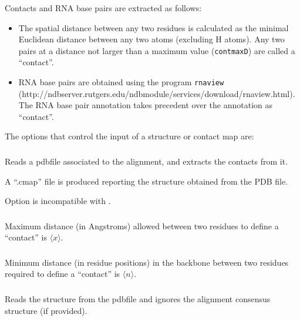 Contacts and RNA base pairs are extracted as follows:
\begin{itemize}

\item The spatial distance between any two residues is calculated as the  minimal Euclidean distance between any two atoms (excluding
 H atoms). Any two pairs at a distance not larger than a maximum value
(\texttt{contmaxD}) are called a ``contact''.

\item RNA base pairs are obtained using the program \texttt{rnaview}~\citep{YangWesthof03}\\
(http://ndbserver.rutgers.edu/ndbmodule/services/download/rnaview.html).\\
The RNA base pair annotation takes precedent over the annotation as ``contact''.
\end{itemize}

\vspace{2mm}
\noindent
The options that control the input of a structure or contact map are:

\subsubsection{} Reads a pdbfile associated to the alignment, and extracts the contacts
from it.

A ``.cmap'' file is produced reporting the structure obtained from the PDB file.

Option  is incompatible with .

\subsubsection{} Maximum distance (in Angstroms) allowed between two residues to define a ``contact'' is $\langle x\rangle$.

\subsubsection{} Minimum distance (in residue positions) in the backbone between two residues required to define a ``contact'' is $\langle n\rangle$.
\vspace{5mm}

\subsubsection{} Reads the structure from the pdbfile and ignores the alignment consensus structure (if provided).


